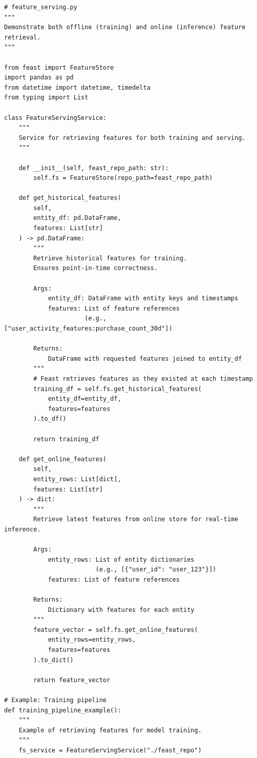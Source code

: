 \begin{lstlisting}[style=python, caption=Feature serving for training and inference]
# feature_serving.py
"""
Demonstrate both offline (training) and online (inference) feature retrieval.
"""

from feast import FeatureStore
import pandas as pd
from datetime import datetime, timedelta
from typing import List

class FeatureServingService:
    """
    Service for retrieving features for both training and serving.
    """

    def __init__(self, feast_repo_path: str):
        self.fs = FeatureStore(repo_path=feast_repo_path)

    def get_historical_features(
        self,
        entity_df: pd.DataFrame,
        features: List[str]
    ) -> pd.DataFrame:
        """
        Retrieve historical features for training.
        Ensures point-in-time correctness.

        Args:
            entity_df: DataFrame with entity keys and timestamps
            features: List of feature references
                      (e.g., ["user_activity_features:purchase_count_30d"])

        Returns:
            DataFrame with requested features joined to entity_df
        """
        # Feast retrieves features as they existed at each timestamp
        training_df = self.fs.get_historical_features(
            entity_df=entity_df,
            features=features
        ).to_df()

        return training_df

    def get_online_features(
        self,
        entity_rows: List[dict],
        features: List[str]
    ) -> dict:
        """
        Retrieve latest features from online store for real-time inference.

        Args:
            entity_rows: List of entity dictionaries
                         (e.g., [{"user_id": "user_123"}])
            features: List of feature references

        Returns:
            Dictionary with features for each entity
        """
        feature_vector = self.fs.get_online_features(
            entity_rows=entity_rows,
            features=features
        ).to_dict()

        return feature_vector

# Example: Training pipeline
def training_pipeline_example():
    """
    Example of retrieving features for model training.
    """
    fs_service = FeatureServingService("./feast_repo")


\end{lstlisting}
